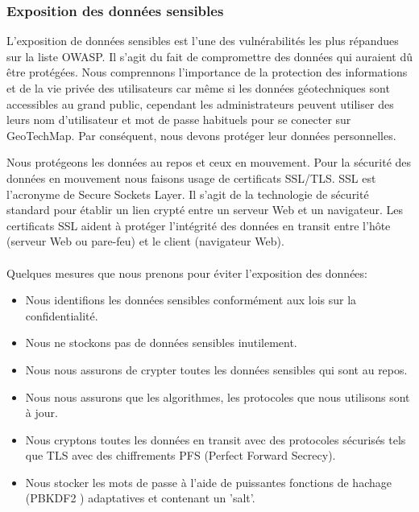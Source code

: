     \subsubsection{Exposition des données sensibles}
        L'exposition de données sensibles est l'une des vulnérabilités les plus répandues sur la liste OWASP. 
        Il s'agit du fait de compromettre des données qui auraient dû être protégées.
        Nous comprennons l’importance de la protection des informations et de 
        la vie privée des utilisateurs car même si les données géotechniques sont accessibles au grand public,
        cependant les administrateurs peuvent utiliser des leurs nom d'utilisateur et mot de passe habituels pour se
        conecter sur GeoTechMap. Par conséquent, nous devons protéger leur données personnelles. 
        \par 
        Nous protégeons les données au repos et ceux en mouvement. Pour la sécurité des données en mouvement
        nous faisons usage de certificats SSL/TLS.
        SSL est l'acronyme de Secure Sockets Layer. Il s'agit de la technologie de sécurité standard pour 
        établir un lien crypté entre un serveur Web et un navigateur. Les certificats SSL aident à 
        protéger l'intégrité des données en transit entre l'hôte (serveur Web ou pare-feu) et le client 
        (navigateur Web).
        \paragraph{}
        Quelques mesures que nous prenons pour éviter l'exposition des données:
        \begin{itemize}
            \item Nous identifions les données sensibles conformément aux lois sur la confidentialité.
            \item Nous ne stockons pas de données sensibles inutilement.
            \item Nous nous assurons de crypter toutes les données sensibles qui sont au repos.
            \item Nous nous assurons que les algorithmes, les protocoles que nous utilisons sont à 
            jour.
            \item Nous cryptons toutes les données en transit avec des protocoles sécurisés tels que 
            TLS avec des chiffrements PFS (Perfect Forward Secrecy).
            \item Nous stocker les mots de passe à l'aide de puissantes fonctions de hachage (PBKDF2 \cite{keycloakdoc}) adaptatives et 
            contenant un 'salt'.
        \end{itemize}

